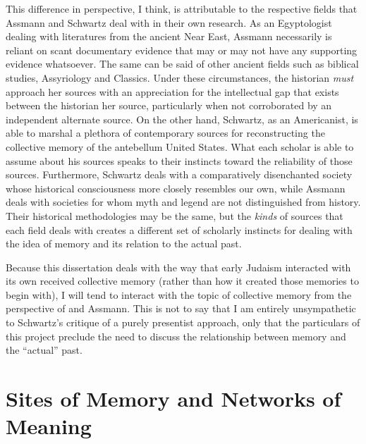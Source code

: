 This difference in perspective, I think, is attributable to the respective fields that Assmann and Schwartz deal with in their own research. As an Egyptologist dealing with literatures from the ancient Near East, Assmann necessarily is reliant on scant documentary evidence that may or may not have any supporting evidence whatsoever. The same can be said of other ancient fields such as biblical studies, Assyriology and Classics. Under these circumstances, the historian \emph{must} approach her sources with an appreciation for the intellectual gap that exists between the historian her source, particularly when not corroborated by an independent alternate source. On the other hand, Schwartz, as an Americanist, is able to marshal a plethora of contemporary sources for reconstructing the collective memory of the antebellum United States. What each scholar is able to assume about his sources speaks to their instincts toward the reliability of those sources. Furthermore, Schwartz deals with a comparatively disenchanted society whose historical consciousness more closely resembles our own, while Assmann deals with societies for whom myth and legend are not distinguished from history. Their historical methodologies may be the same, but the \emph{kinds} of sources that each field deals with creates a different set of scholarly instincts for dealing with the idea of memory and its relation to the actual past.  

Because this dissertation deals with the way that early Judaism interacted with its own received collective memory (rather than how it created those memories to begin with), I will tend to interact with the topic of collective memory from the perspective of \halbwachs and Assmann. This is not to say that I am entirely unsympathetic to Schwartz's critique of a purely presentist approach, only that the particulars of this project preclude the need to discuss the relationship between memory and the ``actual'' past.  


\section{Sites of Memory and Networks of Meaning}

